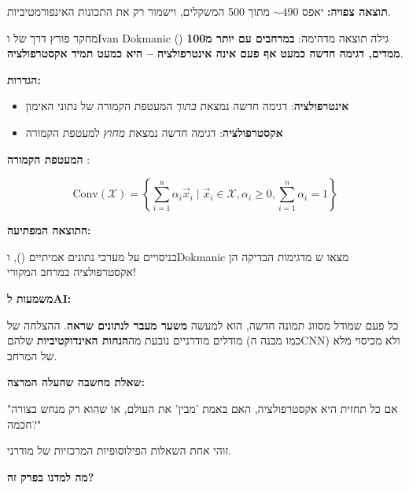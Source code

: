\textbf{תוצאה צפויה:}  יאפס $\sim\num{490}$ מתוך \num{500} המשקלים, וישמור רק את התכונות האינפורמטיביות.


מחקר פורץ דרך של  ו\en{-}Ivan Dokmanic () \cite{chaman2021} גילה תוצאה מדהימה: \textbf{במרחבים עם יותר מ\en{-}\num{100} ממדים, דגימה חדשה כמעט אף פעם אינה אינטרפולציה – היא כמעט תמיד אקסטרפולציה}.

\textbf{הגדרות:}

\begin{itemize}
\item \textbf{אינטרפולציה}: דגימה חדשה נמצאת \textit{בתוך} המעטפת הקמורה  של נתוני האימון
\item \textbf{אקסטרפולציה}: דגימה חדשה נמצאת \textit{מחוץ} למעטפת הקמורה
\end{itemize}

\textbf{המעטפת הקמורה} :

\begin{equation}
\text{Conv}(\mathcal{X}) = \left\{ \sum_{i=1}^{n} \alpha_i \vec{x}_i \mid \vec{x}_i \in \mathcal{X}, \alpha_i \geq \num{0}, \sum_{i=1}^{n} \alpha_i = \num{1} \right\}
\end{equation}

\textbf{התוצאה המפתיעה:}

בניסויים על מערכי נתונים אמיתיים (),  ו\en{-}Dokmanic מצאו ש\en{-} מדגימות הבדיקה הן אקסטרפולציה במרחב המקורי!

\textbf{משמעות ל\en{-}AI:}

כל פעם שמודל  מסווג תמונה חדשה, הוא למעשה \textbf{משער מעבר לנתונים שראה}. ההצלחה של מודלים מודרניים נובעת מה\textbf{הנחות האינדוקטיביות} שלהם (כמו מבנה ה\en{-}CNN) ולא מכיסוי מלא של המרחב.

\textbf{שאלת מחשבה שהעלה המרצה:}

"אם כל תחזית היא אקסטרפולציה, האם  באמת 'מבין' את העולם, או שהוא רק מנחש בצורה חכמה?"

זוהי אחת השאלות הפילוסופיות המרכזיות של  מודרני.


\textbf{מה למדנו בפרק זה?}

